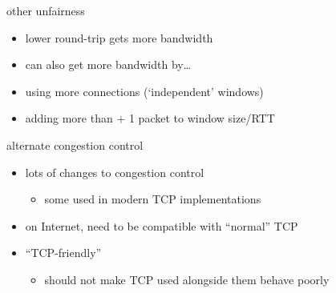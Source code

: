 \begin{frame}{other unfairness}
    \begin{itemize}
    \item lower round-trip gets more bandwidth
    \item can also get more bandwidth by\ldots
    \vspace{.5cm}
    \item using more connections (`independent' windows)
    \item adding more than + 1 packet to window size/RTT
    \end{itemize}
\end{frame}

\begin{frame}{alternate congestion control}
    \begin{itemize}
    \item lots of changes to congestion control
        \begin{itemize}
        \item some used in modern TCP implementations
        \end{itemize}
    \vspace{.5cm}
    \item on Internet, need to be compatible with ``normal'' TCP
    \item ``TCP-friendly''
        \begin{itemize}
        \item should not make TCP used alongside them behave poorly
        \end{itemize}
    \end{itemize}
\end{frame}

